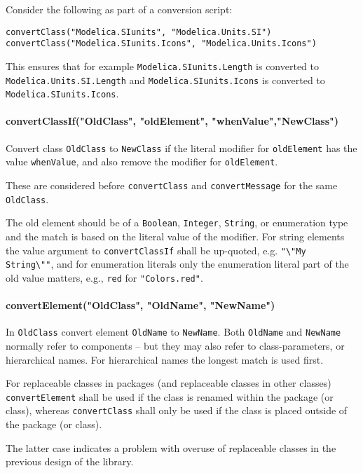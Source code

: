 \begin{example}
Consider the following as part of a conversion script:
\begin{lstlisting}[language=modelica]
convertClass("Modelica.SIunits", "Modelica.Units.SI")
convertClass("Modelica.SIunits.Icons", "Modelica.Units.Icons")
\end{lstlisting}
This ensures that for example \lstinline!Modelica.SIunits.Length! is converted to \lstinline!Modelica.Units.SI.Length!
and \lstinline!Modelica.SIunits.Icons! is converted to \lstinline!Modelica.SIunits.Icons!.
\end{example}
\paragraph*{convertClassIf("OldClass", "oldElement", "whenValue","NewClass")}

Convert class \lstinline!OldClass! to \lstinline!NewClass! if the literal modifier for
\lstinline!oldElement! has the value \lstinline!whenValue!, and also remove the modifier for
\lstinline!oldElement!.

These are considered before \lstinline!convertClass! and \lstinline!convertMessage! for the same
\lstinline!OldClass!.

The old element should be of a \lstinline!Boolean!, \lstinline!Integer!, \lstinline!String!, or enumeration
type and the match is based on the literal value of the modifier.
For string elements the value argument to \lstinline!convertClassIf! shall be up-quoted, e.g. \lstinline!"\"My String\""!,
and for enumeration literals only the enumeration literal part of the old value matters, e.g., \lstinline!red!
for \lstinline!"Colors.red"!.

\paragraph*{convertElement("OldClass", "OldName", "NewName")}

In \lstinline!OldClass! convert element \lstinline!OldName! to \lstinline!NewName!.
Both \lstinline!OldName! and \lstinline!NewName!
normally refer to components -- but they may also refer to
class-parameters, or hierarchical names. For hierarchical names the
longest match is used first.

For replaceable classes in packages (and replaceable classes in other classes) \lstinline!convertElement! shall
be used if the class is renamed within the package (or class), whereas \lstinline!convertClass! shall only be used if the class
is placed outside of the package (or class).
\begin{nonnormative}
The latter case indicates a problem with overuse of replaceable classes in the previous design of the library.
\end{nonnormative}

